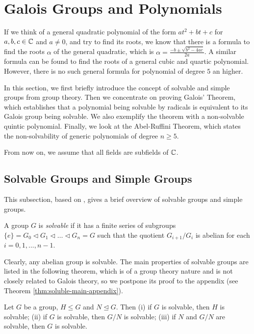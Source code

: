 \section{Galois Groups and Polynomials} \label{sec:galois-groups-and-polynomials}
If we think of a general quadratic polynomial of the form $at^2+bt+c$ for $a, b, c\in \mathbb C$ and $a \neq 0$, and try to find its roots, we know that there is a formula to find the roots $\alpha$ of the general quadratic, which is $\alpha = \frac{-b \pm \sqrt{b^2 - 4ac}}{2a}$. A similar formula can be found to find the roots of a general cubic and quartic polynomial. However, there is no such general formula for polynomial of degree $5$ an higher. 

In this section, we first briefly introduce the concept of solvable and simple groups from group theory. Then we concentrate on proving Galois' Theorem, which establishes that a polynomial being solvable by radicals is equivalent to its Galois group being solvable. We also exemplify the theorem with a non-solvable quintic polynomial. Finally, we look at the Abel-Ruffini Theorem, which states the non-solvability of generic polynomials of degree $n \ge 5$.  

From now on, we assume that all fields are subfields of $\mathbb C$.  
\subsection{Solvable Groups and Simple Groups}
This subsection, based on \cite[Chapter~14]{Stewart}, gives a brief overview of solvable groups and simple groups. 
\begin{definition} \label{def:soluble}
    A group $G$ is \textit{solvable} if it has a finite series of subgroups 
    $ \{ e \} = G_0 \triangleleft G_1 \triangleleft \dots \triangleleft G_n = G$
    such that the quotient $G_{i+1} / G_{i}$ is abelian for each $i = 0, 1, ...,  n - 1$.
\end{definition}

Clearly, any abelian group is solvable. The main properties of solvable groups are listed in the following theorem, which is of a group theory nature and is not closely related to Galois theory, so we postpone its proof to the appendix (see Theorem \ref{thm:soluble-main-appendix}). 

\begin{theorem} \label{thm:soluble-main}
    Let $G$ be a group, $H \le G$ and $N \trianglelefteq G$. Then 
    (i) if $G$ is solvable, then $H$ is solvable;
    (ii) if $G$ is solvable, then $G / N$ is solvable; 
    (iii) if $N$ and $G / N$ are solvable, then $G$ is solvable. 
\end{theorem}


